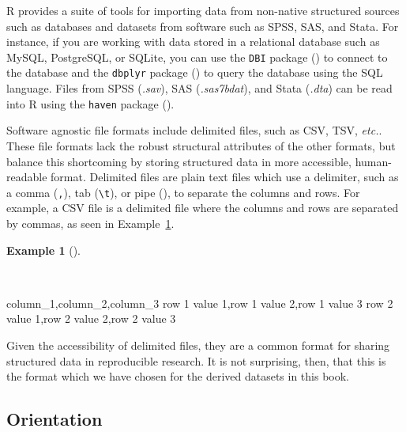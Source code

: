 \documentclass[
  letterpaper,
  DIV=11,
  numbers=noendperiod]{scrreprt}
\newenvironment{Shaded}{\begin{snugshade}}{\end{snugshade}}
\newcommand{\NormalTok}[1]{\textcolor[rgb]{0.00,0.00,0.00}{#1}}
\theoremstyle{definition}
\newtheorem{example}{Example}[chapter]
\theoremstyle{remark}
\begin{document}
R provides a suite of tools for importing data from non-native
structured sources such as databases and datasets from software such as
SPSS, SAS, and Stata. For instance, if you are working with data stored
in a relational database such as MySQL, PostgreSQL, or SQLite, you can
use the \texttt{DBI} package () to connect to
the database and the \texttt{dbplyr} package
() to query the
database using the SQL language. Files from SPSS (\emph{.sav}), SAS
(\emph{.sas7bdat}), and Stata (\emph{.dta}) can be read into R using the
\texttt{haven} package ().

Software agnostic file formats include delimited files, such as CSV,
TSV, \emph{etc.}. These file formats lack the robust structural
attributes of the other formats, but balance this shortcoming by storing
structured data in more accessible, human-readable format. Delimited
files are plain text files which use a delimiter, such as a comma
(\texttt{,}), tab (\texttt{\textbackslash{}t}), or pipe
(\texttt{\textbar{}}), to separate the columns and rows. For example, a
CSV file is a delimited file where the columns and rows are separated by
commas, as seen in Example~\ref{exm-cd-csv-example}.

\begin{example}[]\protect\hypertarget{exm-cd-csv-example}{}\label{exm-cd-csv-example}

~

\begin{Shaded}
\begin{Highlighting}[]
\NormalTok{column\_1,column\_2,column\_3}
\NormalTok{row 1 value 1,row 1 value 2,row 1 value 3}
\NormalTok{row 2 value 1,row 2 value 2,row 2 value 3}
\end{Highlighting}
\end{Shaded}

\end{example}

Given the accessibility of delimited files, they are a common format for
sharing structured data in reproducible research. It is not surprising,
then, that this is the format which we have chosen for the derived
datasets in this book.

\subsection{Orientation}\label{orientation-1}
\end{document}

